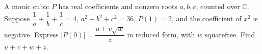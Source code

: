 A monic cubic $P$ has real coefficients and nonzero roots $a,b,c$, counted over $\mathbb C$. Suppose $\dfrac{1}{a}+\dfrac{1}{b}+\dfrac{1}{c}=4$, $a^2+b^2+c^2=36$, $P(1)=2$, and the coefficient of $x^2$ is negative. Express $|P(0)|=\dfrac{u+v\sqrt w}{z}$ in reduced form, with $w$ squarefree. Find $u+v+w+z$.
